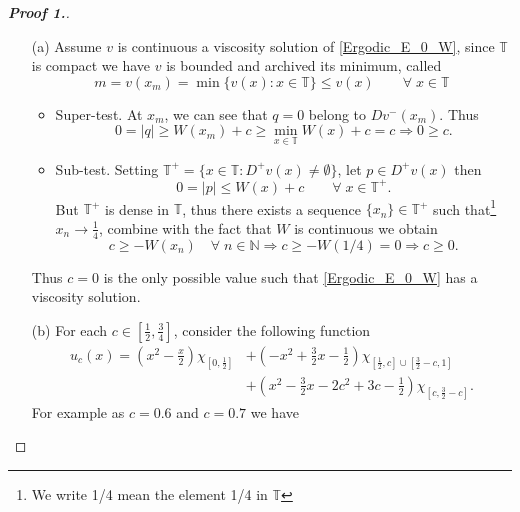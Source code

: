 \documentclass[12pt, oneside]{amsart}  	%
\begin{document}
\begin{proof}[\textbf{Proof 1.}]\quad
\begin{itemize}
\item[(a)] Assume $v$ is continuous a viscosity solution of \eqref{Ergodic_E_0_W}, since $\mathbb{T}$ is compact we have $v$ is bounded and archived its minimum, called 
$$m = v(x_m) = \min \{v(x):x\in \mathbb{T}\} \leq v(x) \qquad\forall\;x\in \mathbb{T} $$
\begin{itemize}
\item Super-test. At $x_m$, we can see that $q = 0$ belong to $Dv^-(x_m)$. Thus
\begin{equation*}
0 = |q| \geq W(x_m)+c \geq \min_{x\in \mathbb{T}} W(x) + c = c \Longrightarrow 0\geq c.
\end{equation*}
\item Sub-test. Setting $\mathbb{T}^+ = \{x\in \mathbb{T}: D^+v(x) \neq \emptyset\}$, let $p\in D^+v(x)$ then
\begin{equation*}
0 = |p| \leq W(x)+c \qquad\forall\; x\in \mathbb{T}^+.
\end{equation*}
But $\mathbb{T}^+$ is dense in $\mathbb{T}$, thus there exists a sequence $\{x_n\}\in \mathbb{T}^+$ such that\footnote{We write 1/4 mean the element 1/4 in $\mathbb{T}$} $x_n\longrightarrow \frac{1}{4}$, combine with the fact that $W$ is continuous we obtain
\begin{equation*}
c\geq -W(x_n) \quad\forall\;n\in \mathbb{N} \Longrightarrow c \geq -W\left(1/4\right) = 0 \Longrightarrow c\geq 0.
\end{equation*}

\end{itemize}
Thus $c = 0$ is the only possible value such that \eqref{Ergodic_E_0_W} has a viscosity solution. 

\item[(b)] For each $c\in \left[\frac{1}{2},\frac{3}{4}\right]$, consider the following function
\begin{align*}
u_c(x) = \left(x^2-\frac{x}{2}\right)\chi_{\left[0,\frac{1}{2}\right]} &+ \left(-x^2 + \frac{3}{2}x - \frac{1}{2}\right)\chi_{\left[\frac{1}{2},c\right]\cup \left[\frac{3}{2}-c,1\right]}\\
&+ \left(x^2-\frac{3}{2}x -2c^2 + 3c-\frac{1}{2}\right)\chi_{\left[c,\frac{3}{2}-c\right]} .
\end{align*}
For example as $c = 0.6$ and $c= 0.7$ we have


\end{itemize}
\end{proof}
\end{document}

